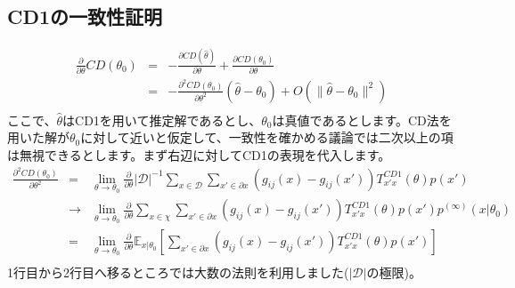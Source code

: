 \documentclass[11pt]{article}
\begin{document}
\subsection{CD1の一致性証明}
\begin{eqnarray}
\frac{\partial}{\partial \theta}CD(\theta_0)&=&-\frac{\partial CD(\hat \theta)}{\partial \theta}+\frac{\partial CD(\theta_0)}{\partial \theta} \\
&=&-\frac{\partial^2 CD(\theta_0)}{\partial \theta^2} (\hat\theta-\theta_0)+O(\|\hat\theta-\theta_0\|^2)\\
\end{eqnarray}
ここで、$\hat\theta$はCD1を用いて推定解であるとし、$\theta_0$は真値であるとします。CD法を用いた解が$\theta_0$に対して近いと仮定して、一致性を確かめる議論では二次以上の項は無視できるとします。まず右辺に対してCD1の表現を代入します。
\begin{eqnarray}
\frac{\partial^2 CD(\theta_0)}{\partial \theta^2}&=&  \lim_{\theta \to \theta_0}\frac{\partial}{\partial \theta}|{\mathcal D}|^{-1}\sum_{x\in{\mathcal D}}\sum_{x'\in{\partial x}}(g_{ij}(x)-g_{ij}(x'))T_{x'x}^{CD1}(\theta)p(x') \\
&{\to}& \lim_{\theta \to \theta_0}\frac{\partial}{\partial \theta}\sum_{x\in\chi}\sum_{x'\in{\partial x}}(g_{ij}(x)-g_{ij}(x'))T_{x'x}^{CD1}(\theta)p(x')p^{(\infty)}(x|\theta_0)\\
&=& \lim_{\theta \to \theta_0}\frac{\partial}{\partial\theta}{\mathbb E}_{x|\theta_0}[ \sum_{x'\in{\partial x}}(g_{ij}(x)-g_{ij}(x'))T_{x'x}^{CD1}(\theta)p(x')]\\
\end{eqnarray}
1行目から2行目へ移るところでは大数の法則を利用しました(${|\mathcal D|}$の極限)。
\end{document}
